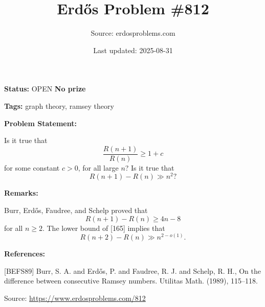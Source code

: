 \documentclass{article}
\title{Erd\H{o}s Problem \#812}
\date{Last updated: 2025-08-31}
\author{Source: erdosproblems.com}
\begin{document}
\maketitle

\noindent\textbf{Status:} OPEN \quad \textbf{No prize}

\noindent\textbf{Tags:} graph theory, ramsey theory

\medskip
\noindent\textbf{Problem Statement:}

Is it true that\[\frac{R(n+1)}{R(n)}\geq 1+c\]for some constant $c>0$, for all large $n$? Is it true that\[R(n+1)-R(n) \gg n^2?\]

\bigskip
\noindent\textbf{Remarks:}

Burr, Erd\H{o}s, Faudree, and Schelp \cite{BEFS89} proved that\[R(n+1)-R(n) \geq 4n-8\]for all $n\geq 2$. The lower bound of [165] implies that\[R(n+2)-R(n) \gg n^{2-o(1)}.\]

\bigskip
\noindent\textbf{References:}

[BEFS89] Burr, S. A. and Erd\H{o}s, P. and Faudree, R. J. and Schelp, R.
H., On the difference between consecutive {R}amsey numbers. Utilitas Math. (1989), 115--118.

\bigskip
\noindent\small{Source: \url{https://www.erdosproblems.com/812}}
\end{document}
